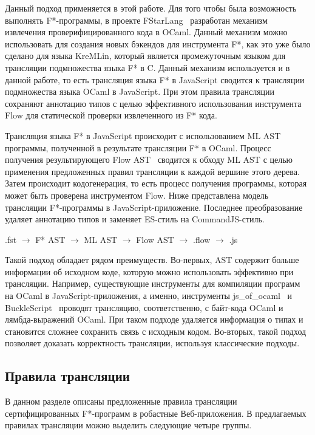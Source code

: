 Данный подход применяется в этой работе. Для того чтобы была возможность выполнять F*-программы, в проекте FStarLang~\cite{fstargh} разработан механизм извлечения проверифицированного кода в OCaml. Данный механизм можно использовать для создания новых бэкендов для инструмента F*, как это уже было сделано для языка KreMLin, который является промежуточным языком для трансляции подмножества языка F* в C. Данный механизм используется и в данной работе, то есть трансляция языка F* в JavaScript сводится к трансляции подмножества языка OCaml в JavaScript. При этом правила трансляции сохраняют аннотацию типов с целью эффективного использования инструмента Flow для статической проверки извлеченного из F* кода.

Трансляция языка F* в JavaScript происходит с использованием ML AST программы, полученной в результате трансляции F* в OCaml. Процесс получения результирующего Flow AST~\cite{flow_ast} сводится к обходу ML AST с целью применения предложенных правил трансляции к каждой вершине этого дерева. Затем происходит кодогенерация, то есть процесс получения программы, которая может быть проверена инструментом Flow. Ниже представлена модель трансляции F*-программы в JavaScript-приложение. Последнее преобразование удаляет аннотацию типов и заменяет ES-стиль на CommandJS-стиль.

\begin{center}
.fst $\to$ F* AST $\to$  ML AST $\to$ Flow AST $\to$ .flow $\to$  .js
\end{center}

Такой подход обладает рядом преимуществ. Во-первых, AST содержит больше информации об исходном коде, которую можно использовать эффективно при трансляции. Например, существующие инструменты для компиляции программ на OCaml в JavaScript-приложения, а именно, инструменты js\_of\_ocaml~\cite{ocamljs} и BuckleScript~\cite{bucklescript} проводят трансляцию, соответственно, с байт-кода OCaml и лямбда-выражений OCaml. При таком подходе удаляется информация о типах и становится сложнее сохранить связь с исходным кодом. Во-вторых, такой подход позволяет доказать корректность трансляции, используя классические подходы. 

\subsection{Правила трансляции}

В данном разделе описаны предложенные правила трансляции сертифицированных F*-программ в робастные Веб-приложения. В предлагаемых правилах трансляции можно выделить следующие четыре группы.

